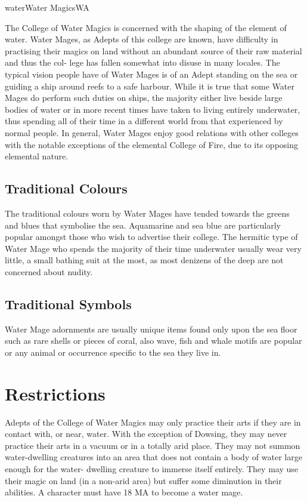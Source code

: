 \begin{College}[1.3]{water}{Water Magics}{WA}

The College of Water Magics is concerned with the shaping of the
element of water.  Water Mages, as Adepts of this college are known,
have difficulty in practising their magics on land without an abundant
source of their raw material and thus the col- lege has fallen
somewhat into disuse in many locales.  The typical vision people have
of Water Mages is of an Adept standing on the sea or guiding a ship
around reefs to a safe harbour. While it is true that some Water Mages
do perform such duties on ships, the majority either live beside large
bodies of water or in more recent times have taken to living entirely
underwater, thus spending all of their time in a different world from
that experienced by normal people.  In general, Water Mages enjoy good
relations with other colleges with the notable exceptions of the
elemental College of Fire, due to its opposing elemental nature.

\subsection{Traditional Colours}

The traditional colours worn by Water Mages have tended towards the
greens and blues that symbolise the sea.  Aquamarine and sea blue are
particularly popular amongst those who wish to advertise their
college.  The hermitic type of Water Mage who spends the majority of
their time underwater usually wear very little, a small bathing suit
at the most, as most denizens of the deep are not concerned about
nudity.

\subsection{Traditional Symbols}

Water Mage adornments are usually unique items found only upon the sea
floor such as rare shells or pieces of coral, also wave, fish and
whale motifs are popular or any animal or occurrence specific to the
sea they live in.

\section{Restrictions}

Adepts of the College of Water Magics may only practice their arts if
they are in contact with, or near, water.  With the exception of
Dowsing, they may never practice their arts in a vacuum or in a
totally arid place.  They may not summon water-dwelling creatures into
an area that does not contain a body of water large enough for the
water- dwelling creature to immerse itself entirely.  They may use
their magic on land (in a non-arid area) but suffer some diminution in
their abilities.  A character must have 18 MA to become a water mage.


\end{College}
